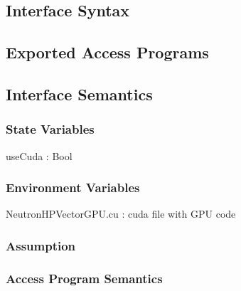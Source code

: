\documentclass[12pt]{article}
\begin{document}
\subsection{Interface Syntax}%

\subsection{Exported Access Programs}%

\subsection{Interface Semantics}

\subsubsection{State Variables}%
useCuda : Bool

\subsubsection{Environment Variables}%
NeutronHPVectorGPU.cu : cuda file with GPU code

\subsubsection{Assumption}%

\subsubsection{Access Program Semantics}%
\end{document}
